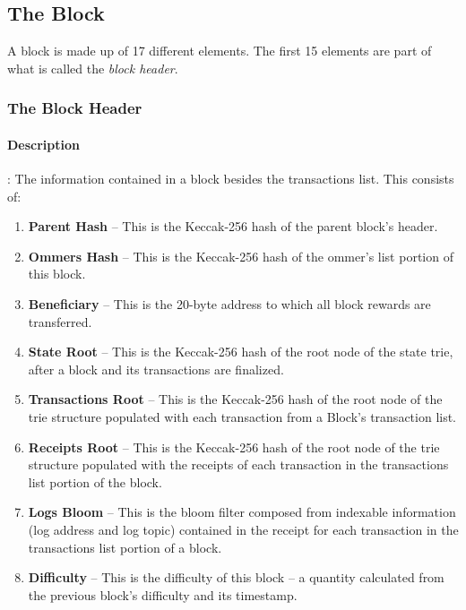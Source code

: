 \documentclass[10pt,a4paper,leqno,bibliography=totoc]{scrartcl}
\newenvironment{alphafootnotes}
{\par\edef\savedfootnotenumber{\number\value{footnote}}
\renewcommand{\thefootnote}{\alph{footnote}}
\setcounter{footnote}{0}}
{\par\setcounter{footnote}{\savedfootnotenumber}}
\begin{document}
\begin{alphafootnotes}
\begin{multicols*}{2}
			\subsection{The Block}
				A block is made up of 17 different elements. The first 15 elements are part of what is called the \textsl{block header}.


			\subsubsection{The Block Header}
				\paragraph{Description}: The information contained in a block besides the transactions list. This consists of:

				\begin{enumerate}
					\item \textbf{Parent Hash} -- This is the Keccak-256 hash of the parent block's header.
					\item \textbf{Ommers Hash} -- This is the Keccak-256 hash of the ommer's list portion of this block.
					\item \textbf{Beneficiary} -- This is the 20-byte address to which all block rewards are transferred.
					\item \textbf{State Root} -- This is the Keccak-256 hash of the root node of the state trie, after a block and its transactions are finalized.
					
					\item \textbf{Transactions Root} -- This is the Keccak-256 hash of the root node of the trie structure populated with each transaction from a Block's transaction list.
					\item \textbf{Receipts Root} -- This is the Keccak-256 hash of the root node of the trie structure populated with the receipts of each transaction in the transactions list portion of the block.
					\item \textbf{Logs Bloom} -- This is the bloom filter composed from indexable information (log address and log topic) contained in the receipt for each transaction in the transactions list portion of a block.
					\item \textbf{Difficulty} -- This is the difficulty of this block -- a quantity calculated from the previous block's difficulty and its timestamp.


\end{enumerate}
\end{multicols*}
\end{alphafootnotes}
\end{document}
